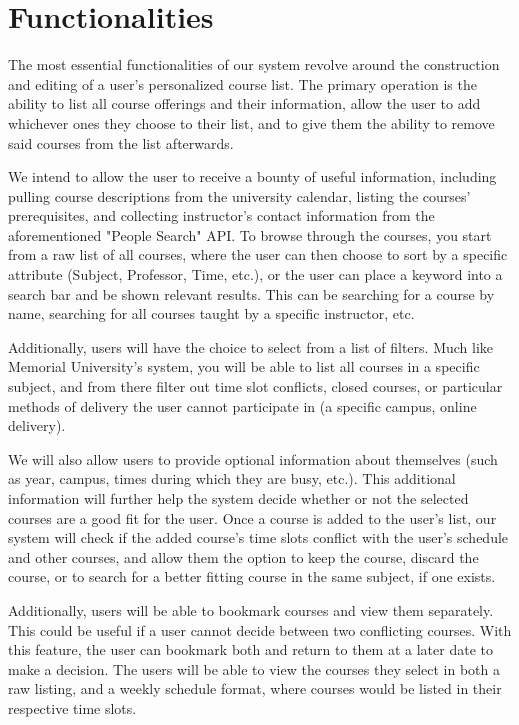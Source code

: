 \documentclass[12pt]{article}
\begin{document}
\section{Functionalities}
The most essential functionalities of our system revolve around the construction and editing of a user's personalized course list. The primary operation is the ability to list all course offerings and their 
information, allow the user to add whichever ones they choose to their list, and to give them the ability to remove said courses from the list afterwards. \par
We intend to allow the user to receive a bounty of useful information, including pulling course descriptions from the university calendar, listing the courses' prerequisites, and collecting instructor's contact 
information from the aforementioned "People Search" API. To browse through the courses, you start from a raw list of all courses, where the user can then choose to sort by a specific attribute (Subject, Professor, Time, etc.), or the user can place a keyword into a search bar and be shown relevant results. This can be searching for a course by name, 
searching for all courses taught by a specific instructor, etc. \par 
Additionally, users will have the choice to select from a list of filters. Much like Memorial University's system, you will be able to list all courses in a specific subject, and from there filter out time slot conflicts, closed courses, or particular methods of delivery the user cannot participate in (a specific campus, online delivery).\par
We will also allow users to provide optional information about themselves (such as year, campus, times during which they are busy, etc.). This additional information will further help the system decide whether or not the selected courses are a good fit for the user. Once a course is added to the user's list, our system will check if the added course's time slots conflict with the user's schedule and other courses, and allow them the option to keep the course, discard the course, or to search for a better fitting course in the same subject, if one exists. \par
Additionally, users will be able to bookmark courses and view them separately. This could be useful if a user cannot decide between two conflicting courses.  With this feature, the user can bookmark both and return to them at a later date to make a decision. The users will be able to view the courses they select in both a raw listing, and a weekly schedule format, where courses would be listed in their respective time slots. \par
\end{document}
